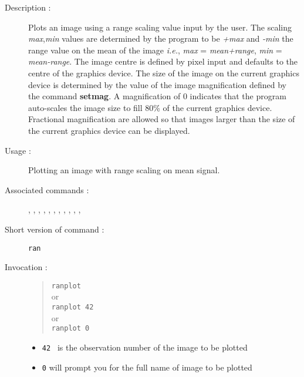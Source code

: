 \begin{description}

\item[Description :] Plots an image using a range scaling value input
by the user.  The scaling {\it max},{\it min} values are determined by
the program to be {\it +max} and {\it -min} the range value on
the mean of the image \emph{i.e.}, {\it max} = {\it mean+range}, {\it min} =
{\it mean-range}. The image centre is defined by pixel input and defaults to
the centre of the graphics device. The size of the image on the current
graphics device is determined by the value of the image magnification
defined by the command {\bf setmag}.  A magnification of 0 indicates that the
program auto-scales the image size to fill 80\% of the current graphics
device.  Fractional magnification are allowed so that images larger
than the size of the current graphics device can be displayed.

\item[Usage :] Plotting an image with range scaling on mean signal.

\item[Associated commands :] {\tt {}}, 
{\tt {}}, {\tt {}}, 
{\tt {}}, {\tt {}}, 
{\tt {}}, {\tt {}}, 
{\tt {}}, {\tt {}}, 
{\tt {}}, {\tt {}}, 
{\tt {}}

\item[Short version of command :] {\tt ran}
\item[Invocation :]

\begin{quote}{\tt  ranplot }\\
or \\
{\tt ranplot 42 }\\
or \\ 
{\tt ranplot 0 }
\end{quote}

\begin{itemize}
\item {\tt 42 } is the observation number of the image to be plotted
\item {\tt 0} will prompt you for the full name of image to be plotted
\end{itemize}

\end{description}

